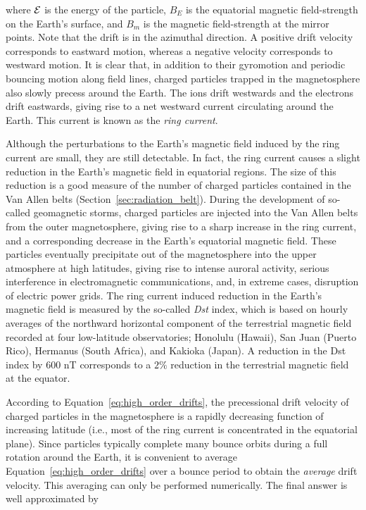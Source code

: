\documentclass[
  notoc %
]{tufte-book}
\begin{document}
where \({\cal E}\) is the energy of the particle, \(B_E\) is the
equatorial magnetic field-strength on the Earth's surface, and \(B_m\)
is the magnetic field-strength at the mirror points. Note that the drift
is in the azimuthal direction. A positive drift velocity corresponds to
eastward motion, whereas a negative velocity corresponds to westward
motion. It is clear that, in addition to their gyromotion and periodic
bouncing motion along field lines, charged particles trapped in the
magnetosphere also slowly precess around the Earth. The ions drift
westwards and the electrons drift eastwards, giving rise to a net
westward current circulating around the Earth. This current is known as
the \emph{ring current}.

Although the perturbations to the Earth's magnetic field induced by the
ring current are small, they are still detectable. In fact, the ring
current causes a slight reduction in the Earth's magnetic field in
equatorial regions. The size of this reduction is a good measure of the
number of charged particles contained in the Van Allen belts
(Section~\ref{sec:radiation_belt}). During the development of so-called
geomagnetic storms, charged particles are injected into the Van Allen
belts from the outer magnetosphere, giving rise to a sharp increase in
the ring current, and a corresponding decrease in the Earth's equatorial
magnetic field. These particles eventually precipitate out of the
magnetosphere into the upper atmosphere at high latitudes, giving rise
to intense auroral activity, serious interference in electromagnetic
communications, and, in extreme cases, disruption of electric power
grids. The ring current induced reduction in the Earth's magnetic field
is measured by the so-called \emph{Dst} index, which is based on hourly
averages of the northward horizontal component of the terrestrial
magnetic field recorded at four low-latitude observatories; Honolulu
(Hawaii), San Juan (Puerto Rico), Hermanus (South Africa), and Kakioka
(Japan). A reduction in the Dst index by 600 nT corresponds to a \(2\%\)
reduction in the terrestrial magnetic field at the equator.

According to Equation~\ref{eq:high_order_drifts}, the precessional drift
velocity of charged particles in the magnetosphere is a rapidly
decreasing function of increasing latitude (i.e., most of the ring
current is concentrated in the equatorial plane). Since particles
typically complete many bounce orbits during a full rotation around the
Earth, it is convenient to average Equation~\ref{eq:high_order_drifts}
over a bounce period to obtain the \emph{average} drift velocity. This
averaging can only be performed numerically. The final answer is well
approximated by
\end{document}
